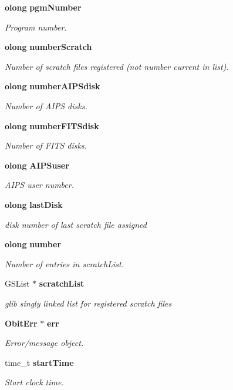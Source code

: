 \begin{CompactItemize}
{\bf olong} {\bf pgm\-Number}
\begin{CompactList}\small\item\em Program number. \item\end{CompactList}\item 
{\bf olong} {\bf number\-Scratch}
\begin{CompactList}\small\item\em Number of scratch files registered (not number current in list). \item\end{CompactList}\item 
{\bf olong} {\bf number\-AIPSdisk}
\begin{CompactList}\small\item\em Number of AIPS disks. \item\end{CompactList}\item 
{\bf olong} {\bf number\-FITSdisk}
\begin{CompactList}\small\item\em Number of FITS disks. \item\end{CompactList}\item 
{\bf olong} {\bf AIPSuser}
\begin{CompactList}\small\item\em AIPS user number. \item\end{CompactList}\item 
{\bf olong} {\bf last\-Disk}
\begin{CompactList}\small\item\em disk number of last scratch file assigned \item\end{CompactList}\item 
{\bf olong} {\bf number}
\begin{CompactList}\small\item\em Number of entries in scratch\-List. \item\end{CompactList}\item 
GSList $\ast$ {\bf scratch\-List}
\begin{CompactList}\small\item\em glib singly linked list for registered scratch files \item\end{CompactList}\item 
{\bf Obit\-Err} $\ast$ {\bf err}
\begin{CompactList}\small\item\em Error/message object. \item\end{CompactList}\item 
time\_\-t {\bf start\-Time}
\begin{CompactList}\small\item\em Start clock time. \item\end{CompactList}\end{CompactItemize}


